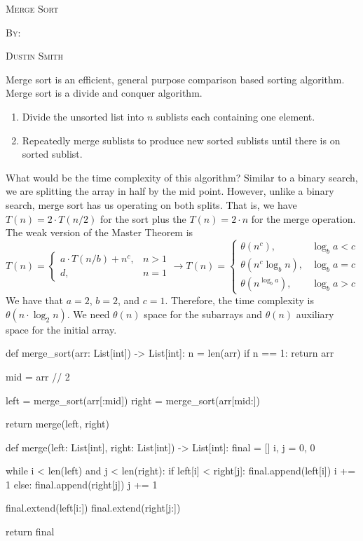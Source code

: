 \documentclass[12pt,dvipsnames,svgnames,x11names]{article}
\begin{document}
%
\pagecolor{gray!50}
\begin{center}
  \begin{center}
  \vspace*{\fill}
  \textsc{\LARGE Merge Sort}
  \par\bigskip
  \textsc{By:}
  \par\bigskip
  \textsc{\LARGE Dustin Smith}
  \vspace*{\fill}
\end{center}
\end{center}

\newpage

Merge sort is an efficient, general purpose comparison based sorting algorithm. Merge sort is a divide
and conquer algorithm.
\begin{enumerate}
	\item Divide the unsorted list into \(n\) sublists each containing one element.
	\item Repeatedly merge sublists to produce new sorted sublists until there is on sorted sublist.
\end{enumerate}
What would be the time complexity of this algorithm? Similar to a binary search, we are splitting the 
array in half by the mid point. However, unlike a binary search, merge sort has us operating on both splits.
That is, we have \(T(n) = 2\cdot T(n / 2)\) for the sort plus the \(T(n) = 2\cdot n\) for the merge operation. 
The weak version of the Master Theorem is
\[
	T(n) =
	\begin{cases}
		a\cdot T(n / b) + n^c, & n > 1\\
		d, & n = 1
	\end{cases} \rightarrow
	T(n) = 
	\begin{cases}
		\theta(n^c), & \log_b a < c\\
		\theta(n^c\log_b n), & \log_b a = c\\
		\theta(n^{\log_b a}), & \log_b a > c
	\end{cases}
\]
We have that \(a = 2\), \(b = 2\), and \(c = 1\). Therefore, the time complexity is \(\theta(n\cdot\log_2 n)\).
We need \(\theta(n)\) space for the subarrays and \(\theta(n)\) auxiliary space for the initial array.
\begin{python}
def merge_sort(arr: List[int]) -> List[int]:
  n = len(arr)
  if n == 1:
    return arr
    
  mid = arr // 2
  
  left = merge_sort(arr[:mid])
  right = merge_sort(arr[mid:])
  
  return merge(left, right)
  
  
def merge(left: List[int], right: List[int]) -> List[int]:
  final = []
  i, j = 0, 0
  
  while i < len(left) and j < len(right):
    if left[i] < right[j]:
      final.append(left[i])
      i += 1
    else:
      final.append(right[j])
      j += 1
      
  final.extend(left[i:])
  final.extend(right[j:])
  
  return final
\end{python}
\end{document}
